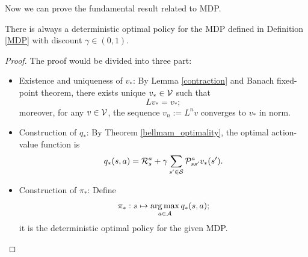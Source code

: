 Now we can prove the fundamental result related to MDP.
\begin{theorem}
	There is always a deterministic optimal policy for the MDP defined in Definition \ref{MDP} with discount $\gamma \in (0,1)$.  
\end{theorem}
\begin{proof}  
	The proof would be divided into three part:
	\begin{itemize}
		\item Existence and uniqueness of $v_\ast$: By Lemma \ref{contraction} and Banach fixed-point theorem, there exists unique $v_\ast \in \mathcal{V}$ such that 
		$$L v_\ast = v_\ast;$$
		moreover, for any $v\in \mathcal{V}$, the sequence $v_n:= L^n v$ converges to $v_\ast$ in norm.
		
		\item Construction of $q_\ast$: By Theorem \ref{bellmam_optimality}, the optimal action-value function is
		$$q_\ast(s,a) = \mathcal{R}_s^a + \gamma \sum_{s'\in\mathcal{S}} \mathcal{P}_{ss'}^a v_\ast(s').$$
		
		\item Construction of $\pi_\ast$: Define 
		\begin{align*}
			\pi_\ast: s \mapsto \operatorname*{arg\,max}_{a \in \mathcal{A}} q_\ast (s,a);
		\end{align*}
		it is the deterministic optimal policy for the given MDP.
	\end{itemize}
	
\end{proof}

